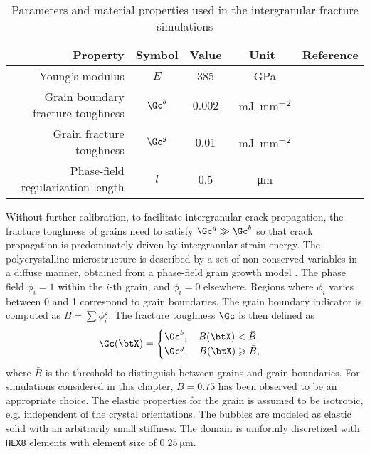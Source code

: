\begin{table}[!htb]
  \centering
  \caption{Parameters and material properties used in the intergranular fracture simulations}
  \label{table: brittle material properties}
  \begin{tabular}{ r c c c c }
    \toprule
    \textbf{Property}                 & \textbf{Symbol} & \textbf{Value} & \textbf{Unit}                              & \textbf{Reference} \\
    \midrule
    Young's modulus                   & $E$             & 385            & \SI{}{\giga\pascal}                        & \cite{govers_2007} \\
    Grain boundary fracture toughness & $\Gc^b$         & 0.002          & \SI{}{\milli\joule\per\square\milli\meter} & \cite{pritam_2016} \\
    Grain fracture toughness          & $\Gc^g$         & 0.01           & \SI{}{\milli\joule\per\square\milli\meter} &                    \\
    Phase-field regularization length & $l$             & 0.5            & \SI{}{\micro\meter}                        &                    \\
    \bottomrule
  \end{tabular}
\end{table}

Without further calibration, to facilitate intergranular crack propagation, the fracture toughness of grains need to satisfy $\Gc^g \gg \Gc^b$
so that crack propagation is predominately driven by intergranular strain energy. The polycrystalline microstructure is described by a set of non-conserved variables in a diffuse manner, obtained from a phase-field grain growth model \cite{Moelans2008}. The phase field $\phi_i = 1$ within the $i$-th grain, and $\phi_i = 0$ elsewhere. Regions where $\phi_i$ varies between 0 and 1 correspond to grain boundaries. The grain boundary indicator is computed as $B = \sum\phi_i^2$. The fracture toughness $\Gc$ is then defined as
\begin{align}
  \Gc(\btX) =
  \begin{cases}
    \Gc^b, \quad B(\btX) < \bar{B}, \\
    \Gc^g, \quad B(\btX) \geqslant \bar{B},
  \end{cases}
\end{align}
where $\bar{B}$ is the threshold to distinguish between grains and grain boundaries. For simulations considered in this chapter, $\bar{B} = 0.75$ has been observed to be an appropriate choice. The elastic properties for the grain is assumed to be isotropic, e.g. independent of the crystal orientations. The bubbles are modeled as elastic solid with an arbitrarily small stiffness. The domain is uniformly discretized with \texttt{HEX8} elements with element size of $\SI{0.25}{\micro\meter}$.

